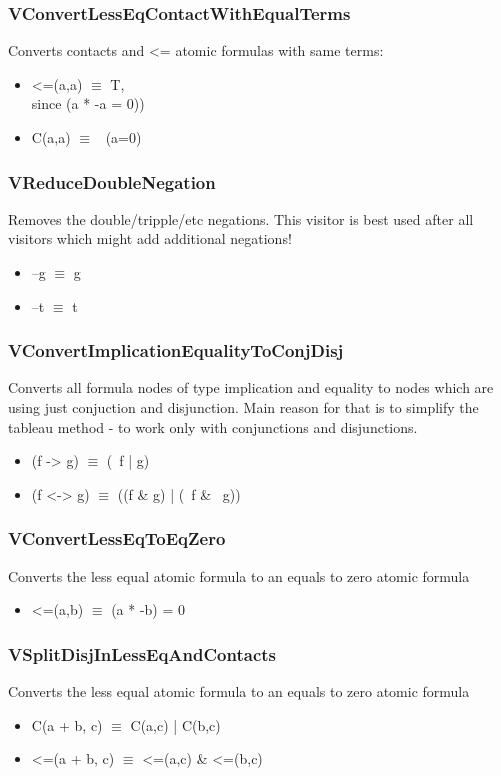 \documentclass{article}
\begin{document}
				\subsubsection*{VConvertLessEqContactWithEqualTerms}
					Converts contacts and <= atomic formulas with same terms:
					\begin{itemize}
						\item <=(a,a) $\equiv$ T, \\
							since (a * -a = 0))
						\item C(a,a) $\equiv$ ~(a=0)
					\end{itemize}
				\subsubsection*{VReduceDoubleNegation}
					Removes the double/tripple/etc negations. 
					This visitor is best used after all visitors which might add additional negations!
					\begin{itemize}
						\item --g $\equiv$ g
						\item --t $\equiv$ t
					\end{itemize}
				\subsubsection*{VConvertImplicationEqualityToConjDisj}
					Converts all formula nodes of type implication and equality to nodes 
					which are using just conjuction and disjunction. 
					Main reason for that is to simplify the tableau method - 
					to work only with conjunctions and disjunctions.
					\begin{itemize}
						\item (f -> g)  $\equiv$ (~f | g)
						\item (f <-> g) $\equiv$ ((f \& g) | (~f \& ~g))
					\end{itemize}
				\subsubsection*{VConvertLessEqToEqZero}
					Converts the less equal atomic formula to an equals to zero atomic formula
					\begin{itemize}
						\item <=(a,b) $\equiv$ (a * -b) = 0
					\end{itemize}
				\subsubsection*{VSplitDisjInLessEqAndContacts}
					Converts the less equal atomic formula to an equals to zero atomic formula
					\begin{itemize}
						\item C(a + b, c) $\equiv$ C(a,c) | C(b,c)
						\item <=(a + b, c) $\equiv$ <=(a,c) \& <=(b,c)
					\end{itemize}
\end{document}
